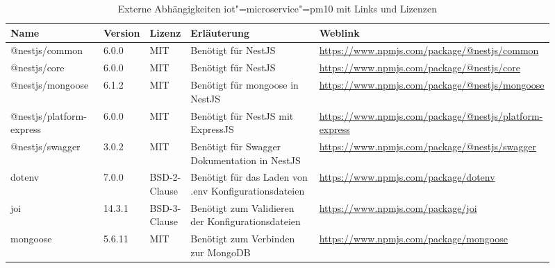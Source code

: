 \begin{landscape}
\begin{table}[htb]
	\caption{Externe Abhängigkeiten iot"=microservice"=pm10 mit Links und Lizenzen}
	\begin{tabular}{|p{0.18\linewidth}|p{0.06\linewidth}|p{0.06\linewidth}|p{0.28\linewidth}|p{0.33\linewidth}|}
		\hline
		Name & Version & Lizenz & Erläuterung & Weblink \\ \hline
		@nestjs/common & 6.0.0 & MIT & Benötigt für NestJS & \small\url{https://www.npmjs.com/package/@nestjs/common} \\ \hline
		@nestjs/core & 6.0.0 & MIT & Benötigt für NestJS & \small\url{https://www.npmjs.com/package/@nestjs/core} \\ \hline
		@nestjs/mongoose & 6.1.2 & MIT & Benötigt für mongoose in NestJS & \small\url{https://www.npmjs.com/package/@nestjs/mongoose} \\ \hline
		@nestjs/platform-express & 6.0.0 & MIT & Benötigt für NestJS mit ExpressJS & \small\url{https://www.npmjs.com/package/@nestjs/platform-express} \\ \hline
		@nestjs/swagger & 3.0.2 & MIT & Benötigt für Swagger Dokumentation in NestJS & \small\url{https://www.npmjs.com/package/@nestjs/swagger} \\ \hline
		dotenv & 7.0.0 & BSD-2-Clause & Benötigt für das Laden von .env Konfigurationsdateien & \small\url{https://www.npmjs.com/package/dotenv} \\ \hline
		joi & 14.3.1 & BSD-3-Clause & Benötigt zum Validieren der Konfigurationsdateien & \small\url{https://www.npmjs.com/package/joi} \\ \hline
		mongoose & 5.6.11 & MIT & Benötigt zum Verbinden zur MongoDB & \small\url{https://www.npmjs.com/package/mongoose} \\ \hline
	\end{tabular}
	\label{tbl:dependenciesMicroPM10}
\end{table}


\end{landscape}

